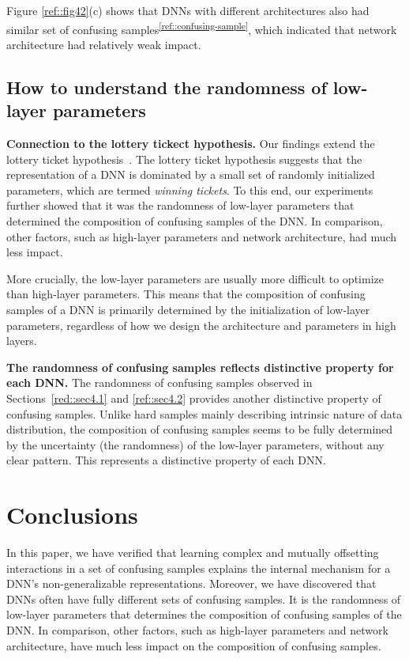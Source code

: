 \documentclass[10pt,twocolumn,letterpaper]{article}
\begin{document}
Figure \ref{ref::fig42}(c) shows that DNNs with different architectures also had similar set of confusing samples\textsuperscript{\ref{ref::confusing-sample}}, which indicated that network architecture had relatively weak impact.


\subsection{How to understand the randomness of low-layer parameters}
\textbf{Connection to the lottery tickect hypothesis.} Our findings extend the lottery ticket hypothesis~\cite{frankle2018lottery}. The lottery ticket hypothesis suggests that the representation of a DNN is dominated by a small set of randomly initialized parameters, which are termed \textit{winning tickets}. To this end, our experiments further showed that it was the randomness of low-layer parameters that determined the composition of confusing samples of the DNN. In comparison, other factors, such as high-layer parameters and network architecture, had much less impact.



More crucially, the low-layer parameters are usually more difficult to optimize than high-layer parameters. This means that the composition of confusing samples of a DNN is primarily determined by the initialization of low-layer parameters, regardless of how we design the architecture and parameters in high layers.

\textbf{The randomness of confusing samples reflects distinctive property for each DNN.}
The randomness of confusing samples observed in Sections~\ref{red::sec4.1} and \ref{ref::sec4.2} provides another distinctive property of confusing samples. Unlike hard samples mainly describing intrinsic nature of data distribution, the composition of confusing samples seems to be fully determined by the uncertainty (the randomness) of the low-layer parameters, without any clear pattern. This represents a distinctive property of each DNN.




\section{Conclusions}
In this paper, we have verified that learning complex and mutually offsetting interactions in a set of confusing samples explains the internal mechanism for a DNN's non-generalizable representations. Moreover, we have discovered that DNNs often have fully different sets of confusing samples. It is the randomness of low-layer parameters that determines the composition of confusing samples of the DNN. In comparison, other factors, such as high-layer parameters and network architecture, have much less impact on the composition of confusing samples.
\end{document}
